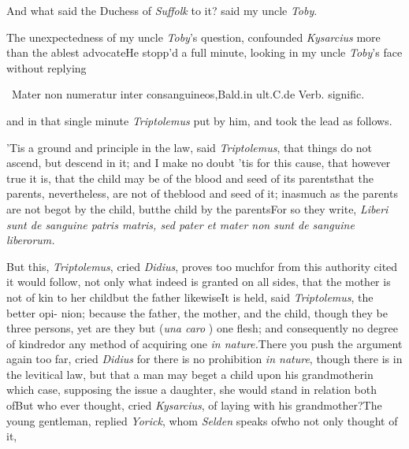 \documentclass{article}
\begin{document}
And what said the Duchess of \textit{Suffolk} to it? said my uncle
\textit{Toby}.

The unexpectedness of my uncle\break
\textit{Toby}’s question, confounded \textit{Kysarcius}\break
more than the ablest advocate\tsh He\break
stopp’d a full minute, looking in my\break
uncle \textit{Toby}’s face without replying\tsh\break
{} 

\begingroup\footnotesize\indent\fnast\ 
Mater non numeratur \vrule width0pt depth 4pt
inter consanguineos,\break Bald.\@ in ult.\@ C.\@ de Verb.
signific.\par\endgroup

\newpage\noindent
and in that single minute \textit{Triptolemus} put by him, and took the lead as
follows.

’Tis a ground and principle in the law, said \textit{Triptolemus}, that things do
not ascend, but descend in it; and I make no doubt ’tis for this cause, that however
true it is, that the child may be of the blood and seed of its parents\tsk that the
parents, nevertheless, are not of the\break blood and seed of it; inasmuch as the parents
are not begot by the child, but\break the child by the parents\tsk For so they write,
\textit{Liberi sunt de sanguine patris \et\break matris, sed
pater et mater non sunt de sanguine liberorum.}

\tsk But this, \textit{Triptolemus}, cried \textit{Didius}, proves too much\tsk for from this
authority cited it would follow, not only\break
what indeed is granted on all sides,
that the mother is not of kin to her\break
child\tsk but the father likewise\tsh It is\break 
held, said \textit{Triptolemus}, the better opi-\break
nion; because the father, the mother,\break
and the child, though they be three\break
persons, yet are they but (\textit{una caro} \fnast)\break
one flesh; and consequently no degree\break
of kindred\tsk or any method of acquiring 
one \textit{in nature.}\tsk There you push the argument again too far,
cried \textit{Didius}\tsh\break
for there is no prohibition \textit{in nature},\break
though there is in the levitical law,\tsk\break
but that a man may beget a child upon\break
his grandmother\tsh in which case, supposing
the issue a daughter, she would stand in relation both
of\tsh But who\break
ever thought, cried \textit{Kysarcius}, of laying with his
grandmother?\tsk The young\break
gentleman, replied \textit{Yorick}, whom \textit{Selden}\break
speaks of\tsk who not only thought of it,\break
{}\etp\break
{}
\end{document}
